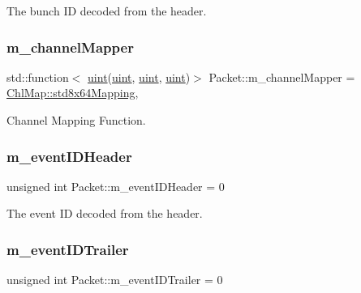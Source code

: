 The bunch ID decoded from the header. 

\mbox{\label{class_packet_a27f9a040a63e06e20a2097133a588997}} 
\subsubsection{\texorpdfstring{m\+\_\+channel\+Mapper}{m\_channelMapper}}
{\footnotesize\ttfamily std\+::function$<$ \hyperlink{_packet_8cpp_a69aa29b598b851b0640aa225a9e5d61d}{uint}(\hyperlink{_packet_8cpp_a69aa29b598b851b0640aa225a9e5d61d}{uint}, \hyperlink{_packet_8cpp_a69aa29b598b851b0640aa225a9e5d61d}{uint}, \hyperlink{_packet_8cpp_a69aa29b598b851b0640aa225a9e5d61d}{uint})$>$ Packet\+::m\+\_\+channel\+Mapper = \hyperlink{namespace_chl_map_a1c25ae4d560fda9abe7fb0684c6ceae7}{Chl\+Map\+::std8x64\+Mapping}\hspace{0.3cm}{\ttfamily [static]}, {\ttfamily [private]}}



Channel Mapping Function. 

\mbox{\label{class_packet_a3abf93570be0669506f39b391bc574ca}} 
\subsubsection{\texorpdfstring{m\+\_\+event\+I\+D\+Header}{m\_eventIDHeader}}
{\footnotesize\ttfamily unsigned int Packet\+::m\+\_\+event\+I\+D\+Header = 0\hspace{0.3cm}{\ttfamily [private]}}



The event ID decoded from the header. 

\mbox{\label{class_packet_ae32fc3c9665b68f00dabd9327d4c84c6}} 
\subsubsection{\texorpdfstring{m\+\_\+event\+I\+D\+Trailer}{m\_eventIDTrailer}}
{\footnotesize\ttfamily unsigned int Packet\+::m\+\_\+event\+I\+D\+Trailer = 0\hspace{0.3cm}{\ttfamily [private]}}



